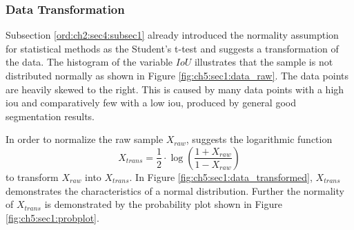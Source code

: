 \subsubsection{Data Transformation}
Subsection \ref{ord:ch2:sec4:subsec1} already introduced the normality assumption for statistical methods as the Student's t-test and suggests a transformation of the data.
The histogram of the variable $IoU$ illustrates that the sample is not distributed normally as shown in Figure \ref{fig:ch5:sec1:data_raw}.
The data points are heavily skewed to the right. 
This is caused by many data points with a high \gls{iou} and comparatively few with a low \gls{iou}, produced by general good segmentation results.

In order to normalize the raw sample $ X_{raw} $, \cite{PS16-Statistics} suggests the logarithmic function
\begin{equation} \label{equ:trans_iou}
	X_{trans} = \frac{1}{2} \cdot \log \left( \frac{1 + X_{raw}}{1 - X_{raw}}\right) 
\end{equation}
to transform $ X_{raw} $ into $ X_{trans} $.
In Figure \ref{fig:ch5:sec1:data_transformed}, $ X_{trans} $ demonstrates the characteristics of a normal distribution.
Further the normality of $ X_{trans} $ is demonstrated by the probability plot shown in Figure \ref{fig:ch5:sec1:probplot}.

